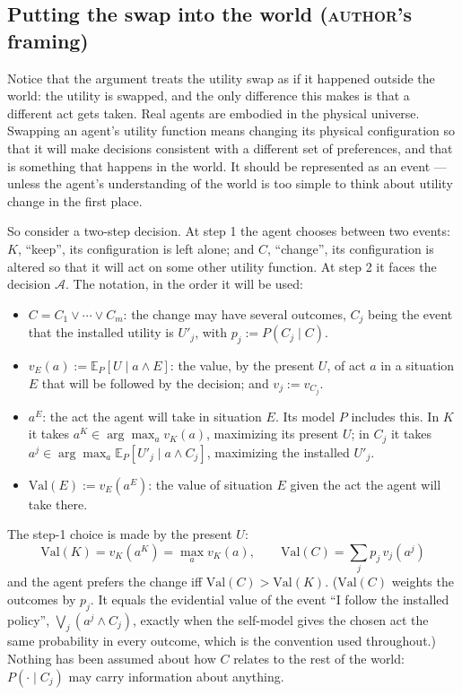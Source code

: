 \documentclass[11pt,a4paper]{article}
\newcommand{\AUTHOR}{\textnormal{\scshape author}}
\begin{document}
\subsection{Putting the swap into the world (\AUTHOR's framing)}
Notice that the argument treats the utility swap as if it happened outside the world: the utility is swapped, and the only difference this makes is that a different act gets taken. Real agents are embodied in the physical universe. Swapping an agent's utility function means changing its physical configuration so that it will make decisions consistent with a different set of preferences, and that is something that happens in the world. It should be represented as an event --- unless the agent's understanding of the world is too simple to think about utility change in the first place.

So consider a two-step decision. At step 1 the agent chooses between two events: $K$, ``keep'', its configuration is left alone; and $C$, ``change'', its configuration is altered so that it will act on some other utility function. At step 2 it faces the decision $\mathcal A$. The notation, in the order it will be used:
\begin{itemize}[leftmargin=1.5em,itemsep=2pt]
\item $C = C_1 \vee \cdots \vee C_m$: the change may have several outcomes, $C_j$ being the event that the installed utility is $U'_j$, with $p_j := P(C_j \mid C)$.
\item $v_E(a) := \mathbb E_P[U \mid a \wedge E]$: the value, by the present $U$, of act $a$ in a situation $E$ that will be followed by the decision; and $v_j := v_{C_j}$.
\item $a^E$: the act the agent will take in situation $E$. Its model $P$ includes this. In $K$ it takes $a^K \in \arg\max_a v_K(a)$, maximizing its present $U$; in $C_j$ it takes $a^j \in \arg\max_a \mathbb E_P[U'_j \mid a \wedge C_j]$, maximizing the installed $U'_j$.
\item $\mathrm{Val}(E) := v_E(a^E)$: the value of situation $E$ given the act the agent will take there.
\end{itemize}
The step-1 choice is made by the present $U$:
\[
\mathrm{Val}(K) = v_K(a^K) = \max_a v_K(a), \qquad \mathrm{Val}(C) = \sum_j p_j\, v_j(a^j)
\]
and the agent prefers the change iff $\mathrm{Val}(C) > \mathrm{Val}(K)$. ($\mathrm{Val}(C)$ weights the outcomes by $p_j$. It equals the evidential value of the event ``I follow the installed policy'', $\bigvee_j (a^j \wedge C_j)$, exactly when the self-model gives the chosen act the same probability in every outcome, which is the convention used throughout.) Nothing has been assumed about how $C$ relates to the rest of the world: $P(\cdot \mid C_j)$ may carry information about anything.
\end{document}
